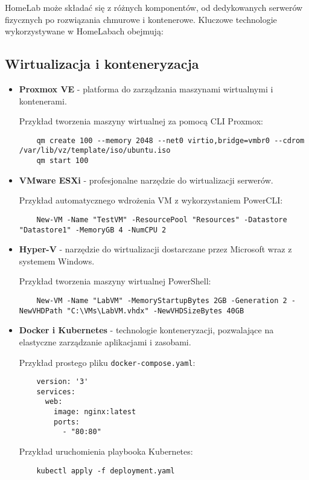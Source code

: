 HomeLab może składać się z różnych komponentów, od dedykowanych serwerów fizycznych po rozwiązania chmurowe i kontenerowe. Kluczowe technologie wykorzystywane w HomeLabach obejmują:

\subsection{Wirtualizacja i konteneryzacja}
\begin{itemize}
    \item \textbf{Proxmox VE} - platforma do zarządzania maszynami wirtualnymi i kontenerami.
    
    Przykład tworzenia maszyny wirtualnej za pomocą CLI Proxmox:
    \begin{verbatim}
    qm create 100 --memory 2048 --net0 virtio,bridge=vmbr0 --cdrom /var/lib/vz/template/iso/ubuntu.iso
    qm start 100
    \end{verbatim}

    \item \textbf{VMware ESXi} - profesjonalne narzędzie do wirtualizacji serwerów.
    
    Przykład automatycznego wdrożenia VM z wykorzystaniem PowerCLI:
    \begin{verbatim}
    New-VM -Name "TestVM" -ResourcePool "Resources" -Datastore "Datastore1" -MemoryGB 4 -NumCPU 2
    \end{verbatim}

    \item \textbf{Hyper-V} - narzędzie do wirtualizacji dostarczane przez Microsoft wraz z systemem Windows.
    
    Przykład tworzenia maszyny wirtualnej PowerShell:
    \begin{verbatim}
    New-VM -Name "LabVM" -MemoryStartupBytes 2GB -Generation 2 -NewVHDPath "C:\VMs\LabVM.vhdx" -NewVHDSizeBytes 40GB
    \end{verbatim}

    \item \textbf{Docker i Kubernetes} - technologie konteneryzacji, pozwalające na elastyczne zarządzanie aplikacjami i zasobami.
    
    Przykład prostego pliku \texttt{docker-compose.yaml}:
    \begin{verbatim}
    version: '3'
    services:
      web:
        image: nginx:latest
        ports:
          - "80:80"
    \end{verbatim}
    
    Przykład uruchomienia playbooka Kubernetes:
    \begin{verbatim}
    kubectl apply -f deployment.yaml
    \end{verbatim}
\end{itemize}

